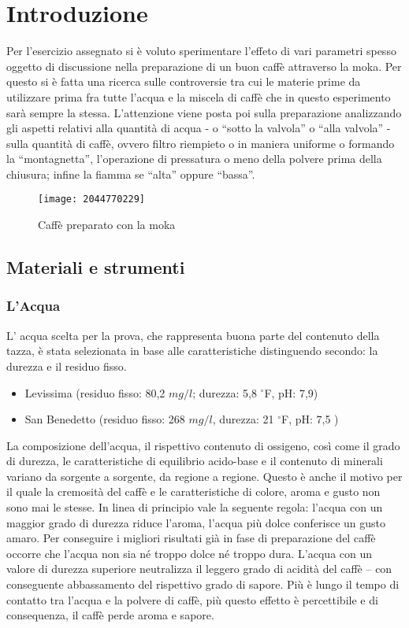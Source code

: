 \chapter{Introduzione}
Per l'esercizio assegnato si è voluto sperimentare l'effeto di vari parametri spesso oggetto di discussione nella preparazione di un buon caffè attraverso la moka.
Per questo si è fatta una ricerca sulle controversie tra cui le materie prime da utilizzare prima fra tutte l'acqua e la miscela di caffè che in questo esperimento sarà sempre la stessa. L'attenzione viene posta poi sulla preparazione analizzando gli aspetti relativi alla quantità di acqua - o “sotto la valvola” o “alla valvola” - sulla quantità di caffè, ovvero filtro riempieto o in maniera uniforme o formando la “montagnetta”, l'operazione di pressatura o meno della polvere prima della chiusura; infine la fiamma se “alta” oppure “bassa”.
\begin{figure}[h]
  \centering
  \texttt{[image: 2044770229]}
  \caption{Caffè preparato con la moka}
  \label{fig:moka}
\end{figure}
\section{Materiali e strumenti}
\subsection{L'Acqua}
L' acqua scelta per la prova, che rappresenta buona parte del contenuto della tazza, è stata selezionata in base alle caratteristiche distinguendo secondo: la durezza e il residuo fisso.
\begin{itemize}
  \item Levissima (residuo fisso: 80,2 $mg/l$; durezza: 5,8 $^{\circ}$F, pH: 7,9)
  \item San Benedetto (residuo fisso: 268 $mg/l$, durezza: 21 $^{\circ}$F, pH: 7,5 )
\end{itemize}
La composizione dell’acqua, il rispettivo contenuto di ossigeno, così come il grado di durezza, le caratteristiche di equilibrio acido-base e il contenuto di minerali variano da sorgente a sorgente, da regione a regione. Questo è anche il motivo per il quale la cremosità del caffè e le caratteristiche di colore, aroma e gusto non sono mai le stesse.
In linea di principio vale la seguente regola: l’acqua con un maggior grado di durezza riduce l’aroma, l’acqua più dolce conferisce un gusto amaro.
Per conseguire i migliori risultati già in fase di preparazione del caffè occorre che l’acqua non sia né troppo dolce né troppo dura. L’acqua con un valore di durezza superiore neutralizza il leggero grado di acidità del caffè – con conseguente abbassamento del rispettivo grado di sapore. Più è lungo il tempo di contatto tra l'acqua e la polvere di caffè, più questo effetto è percettibile e di consequenza, il caffè perde aroma e sapore.

